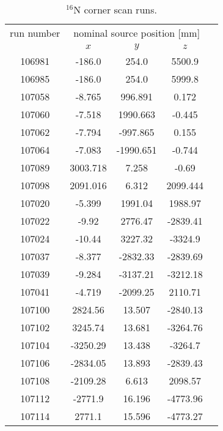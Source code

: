 \begin{table}[ht]
	\caption[$^{16}$N corner scan runs.]{$^{16}$N corner scan runs.	\label{table:n16scanTable_corner}}
			\vspace{2mm}
	\centering
	\begin{tabular*}{90mm}{c@{\extracolsep{\fill}}*4c}
		\toprule 
		run number  & \multicolumn{3}{c}{nominal source position [mm]}  \\
		\cline{2-4}
		& $x$ & $y$ & $z$\\   
		\midrule
        106981  & -186.0 & 254.0 & 5500.9\\
        106985  & -186.0 & 254.0 & 5999.8\\
        107058  & -8.765 & 996.891 & 0.172\\
        107060  & -7.518 & 1990.663 & -0.445\\
        107062  & -7.794 & -997.865 & 0.155\\
        107064  & -7.083 & -1990.651 & -0.744\\
        107089  & 3003.718 & 7.258 & -0.69\\
        107098  & 2091.016 & 6.312 & 2099.444\\
        107020  & -5.399 &  1991.04 &  1988.97\\
        107022  & -9.92 &  2776.47 &  -2839.41\\
        107024  & -10.44 &  3227.32 &  -3324.9\\
        107037  & -8.377 &  -2832.33 &  -2839.69\\
        107039  & -9.284 &  -3137.21 &  -3212.18\\
        107041  & -4.719 &  -2099.25 &  2110.71\\
        107100  & 2824.56 &  13.507 &  -2840.13\\
        107102  & 3245.74 &  13.681 &  -3264.76\\
        107104  & -3250.29 &  13.438 &  -3264.7\\
        107106  & -2834.05 &  13.893 &  -2839.43\\
        107108  & -2109.28 &  6.613 &  2098.57\\
        107112  & -2771.9 &  16.196 &  -4773.96\\
        107114  & 2771.1 &  15.596 &  -4773.27\\
		\bottomrule	
	\end{tabular*}
\end{table}

